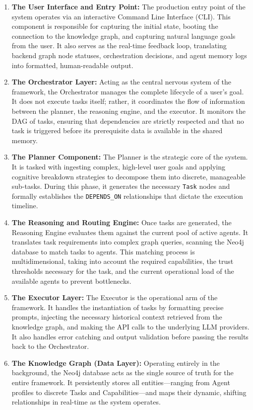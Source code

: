 \begin{enumerate}
    \item \textbf{The User Interface and Entry Point:} The production entry point of the system operates via an interactive Command Line Interface (CLI). This component is responsible for capturing the initial state, booting the connection to the knowledge graph, and capturing natural language goals from the user. It also serves as the real-time feedback loop, translating backend graph node statuses, orchestration decisions, and agent memory logs into formatted, human-readable output.

    \item \textbf{The Orchestrator Layer:} Acting as the central nervous system of the framework, the Orchestrator manages the complete lifecycle of a user’s goal. It does not execute tasks itself; rather, it coordinates the flow of information between the planner, the reasoning engine, and the executor. It monitors the DAG of tasks, ensuring that dependencies are strictly respected and that no task is triggered before its prerequisite data is available in the shared memory.

    \item \textbf{The Planner Component:} The Planner is the strategic core of the system. It is tasked with ingesting complex, high-level user goals and applying cognitive breakdown strategies to decompose them into discrete, manageable sub-tasks. During this phase, it generates the necessary \texttt{Task} nodes and formally establishes the \texttt{DEPENDS\_ON} relationships that dictate the execution timeline.

    \item \textbf{The Reasoning and Routing Engine:} Once tasks are generated, the Reasoning Engine evaluates them against the current pool of active agents. It translates task requirements into complex graph queries, scanning the Neo4j database to match tasks to agents. This matching process is multidimensional, taking into account the required capabilities, the trust thresholds necessary for the task, and the current operational load of the available agents to prevent bottlenecks.

    \item \textbf{The Executor Layer:} The Executor is the operational arm of the framework. It handles the instantiation of tasks by formatting precise prompts, injecting the necessary historical context retrieved from the knowledge graph, and making the API calls to the underlying LLM providers. It also handles error catching and output validation before passing the results back to the Orchestrator.

    \item \textbf{The Knowledge Graph (Data Layer):} Operating entirely in the background, the Neo4j database acts as the single source of truth for the entire framework. It persistently stores all entities—ranging from Agent profiles to discrete Tasks and Capabilities—and maps their dynamic, shifting relationships in real-time as the system operates.
\end{enumerate}

